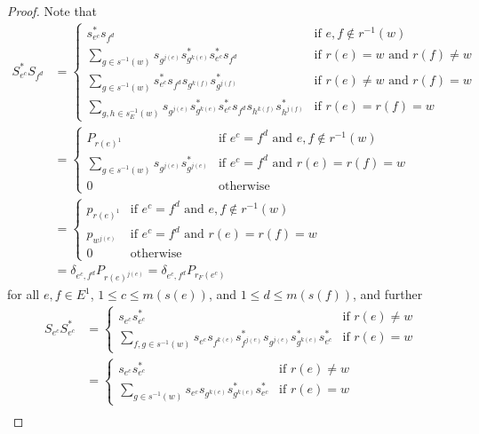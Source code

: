 \documentclass[12pt]{amsbook}%
\theoremstyle{defin}
\theoremstyle{remark}
\numberwithin{equation}{chapter}
\numberwithin{theor}{section}
\begin{document}
\begin{proof}
Note that 
\begin{align*}
S_{e^c}^* S_{f^d} &= 
\begin{cases}
s_{e^c}^* s_{f^d} &\text{if } e, f \notin r^{-1} (w)  \\
\displaystyle \sum_{ g \in s^{-1} (w) }  s_{g^{j(e)}} s_{g^{k(e)} }^* s_{e^c}^*s_{f^d} &\text{if } r(e) = w \text{ and } r(f)\neq w  \\
\displaystyle \sum_{ g \in s^{-1} (w) } s_{e^c}^*  s_{f^d} s_{ g^{k(f)} } s_{g^{j(f)}}^* &\text{if } r(e) \neq w \text{ and } r(f)=w \\ 
\displaystyle \sum_{ g, h \in s_{E}^{-1} (w) } s_{g^{j(e)}} s_{g^{k(e)} }^* s_{e^c}^* s_{f^d} s_{ h^{k(f)} } s_{h^{j(f)}}^* &\text{if  } r(e)= r(f)=w 
\end{cases} \\
&=\begin{cases}
P_{r(e)^1} &\text{if } e^c =f^d  \text{ and } e, f \notin r^{-1} (w) \\
\displaystyle \sum_{ g \in s^{-1} (w) }  s_{g^{j(e)}} s_{g^{j(e)}}^* &\text{if  } e^c = f^d \text{ and } r(e)=r(f)=w \\
0&\text{otherwise}
\end{cases}\\
&=\begin{cases}
p_{r(e)^1} &\text{if } e^c =f^d  \text{ and } e, f \notin r^{-1} (w) \\
p_{w^{j(e)}}  &\text{if  } e^c = f^d \text{ and } r(e)=r(f)=w \\
0&\text{otherwise}
\end{cases}\\
&=\delta_{e^c,f^d}P_{r(e)^{j(e)}} = \delta_{e^c,f^d}P_{r_F(e^c)}
\end{align*}
for all $e, f\in E^1$, $1 \leq c \leq m( s(e) )$, and $1 \leq d \leq m (s(f))$, and further
\begin{align*}
S_{e^c} S_{e^c}^*&=
\begin{cases}
s_{e^c} s_{e^c}^* &\text{if } r(e) \neq w \\
\displaystyle \sum_{f, g \in  s^{-1} ( w ) } s_{e^c} s_{f^{k(e)}} s_{f^{j(e)}}^* s_{g^{j(e)}} s_{g^{k(e)}}^* s_{e^c}^* &\text{if } r(e)=w
\end{cases} \\
&= 
\begin{cases}
s_{e^c} s_{e^c}^* &\text{if } r(e) \neq w \\
\displaystyle \sum_{g \in  s^{-1} ( w ) } s_{e^c} s_{g^{k(e)}} s_{g^{k(e)}}^* s_{e^c}^* &\text{if } r(e)=w
\end{cases} \\

\end{align*}
\end{proof}
\end{document}
